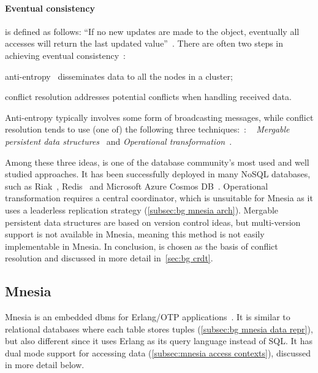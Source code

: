 \paragraph{Eventual consistency} 
is defined as follows: ``If no new updates are made to the object,
eventually all accesses will return the last updated value''~\cite{vogels2008ec}. 
There are often two steps in achieving eventual consistency~\cite{wikipediacontributors2023ec}:
\begin{enumerate*}[(i)]
  \item anti-entropy~\cite{demers1987epidemic} disseminates data to all the nodes 
  in a cluster;
  \item conflict resolution addresses potential conflicts when handling received data.
\end{enumerate*}

Anti-entropy typically involves some form of broadcasting messages, while conflict
resolution tends to use (one of) the following three techniques:~\cite{kleppmann2017DDIA}:
\emph{}~\cite{shapiro2011CRDT,preguica2018CRDT}
\emph{Mergable persistent data structures}~\cite{farinier2015mergable} and
\emph{Operational transformation}~\cite{ellis1989ot}. 

Among these three ideas,  is one of the 
database community's most used and well studied approaches. It has been
successfully deployed in many NoSQL databases, such as 
Riak~\cite{klophaus2010Riak}, Redis~\cite{redis2022rediscrdt} and Microsoft Azure 
Cosmos DB~\cite{shukla2018CosmosDB}. Operational transformation requires a central 
coordinator, which
is unsuitable for Mnesia as it uses a leaderless replication strategy (\cref{subsec:bg mnesia arch}). 
Mergable persistent data structures are based on version
control ideas, but multi-version support is not available in Mnesia,
meaning this method is not easily implementable in Mnesia. In conclusion,
 is chosen as the basis of conflict resolution and discussed in
more detail in~\cref{sec:bg crdt}.


\subsection{Mnesia} \label{sec:bg mnesia}

Mnesia is an embedded \acrshort{dbms} for Erlang/OTP 
applications~\cite{mattsson1998mnesia,mattsson1999mnesiainternal}.
It is similar to relational databases where each table stores 
tuples (\cref{subsec:bg mnesia data repr}), but also
different since it uses Erlang as its query language instead of SQL\@.
It has dual mode support for accessing data (\cref{subsec:mnesia access contexts}),
discussed in more detail below.

